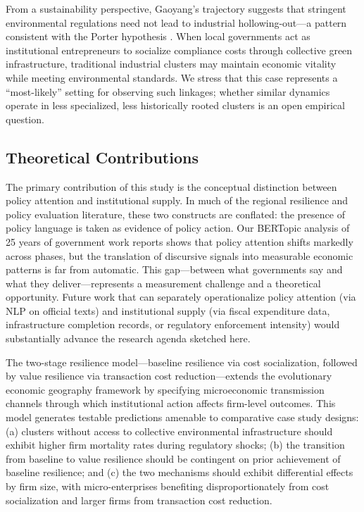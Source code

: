 \documentclass[sustainability,article,submit,moreauthors,pdftex]{mdpi}
\begin{document}
From a sustainability perspective, Gaoyang's trajectory suggests that stringent environmental regulations need not lead to industrial hollowing-out---a pattern consistent with the Porter hypothesis \citep{Porter1995, Greenstone2012}. When local governments act as institutional entrepreneurs to socialize compliance costs through collective green infrastructure, traditional industrial clusters may maintain economic vitality while meeting environmental standards. We stress that this case represents a ``most-likely'' setting for observing such linkages; whether similar dynamics operate in less specialized, less historically rooted clusters is an open empirical question.

\subsection{Theoretical Contributions}
The primary contribution of this study is the conceptual distinction between policy attention and institutional supply. In much of the regional resilience and policy evaluation literature, these two constructs are conflated: the presence of policy language is taken as evidence of policy action. Our BERTopic analysis of 25 years of government work reports shows that policy attention shifts markedly across phases, but the translation of discursive signals into measurable economic patterns is far from automatic. This gap---between what governments say and what they deliver---represents a measurement challenge and a theoretical opportunity. Future work that can separately operationalize policy attention (via NLP on official texts) and institutional supply (via fiscal expenditure data, infrastructure completion records, or regulatory enforcement intensity) would substantially advance the research agenda sketched here.

The two-stage resilience model---baseline resilience via cost socialization, followed by value resilience via transaction cost reduction---extends the evolutionary economic geography framework \citep{Boschma2015, Martin2015} by specifying microeconomic transmission channels through which institutional action affects firm-level outcomes. This model generates testable predictions amenable to comparative case study designs: (a) clusters without access to collective environmental infrastructure should exhibit higher firm mortality rates during regulatory shocks; (b) the transition from baseline to value resilience should be contingent on prior achievement of baseline resilience; and (c) the two mechanisms should exhibit differential effects by firm size, with micro-enterprises benefiting disproportionately from cost socialization and larger firms from transaction cost reduction.
\end{document}
